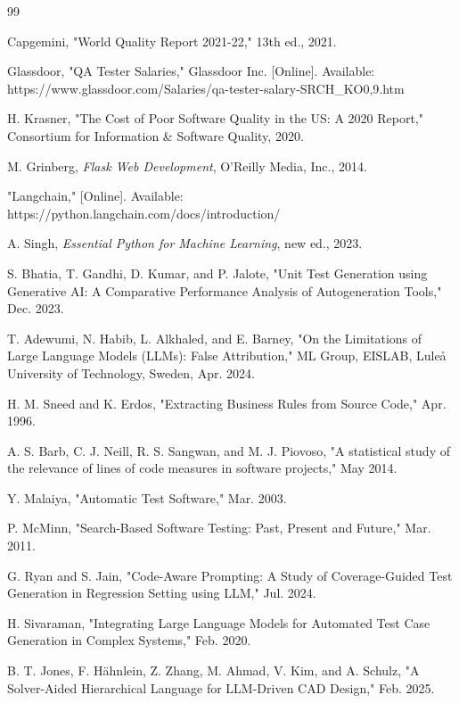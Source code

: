 \documentclass[12pt, oneside]{report}
\begin{document}
\begin{thebibliography}{99}

Capgemini, "World Quality Report 2021-22," 13th ed., 2021.

Glassdoor, "QA Tester Salaries," Glassdoor Inc. [Online]. Available: https://www.glassdoor.com/Salaries/qa-tester-salary-SRCH\_KO0,9.htm

H. Krasner, "The Cost of Poor Software Quality in the US: A 2020 Report," Consortium for Information \& Software Quality, 2020.

M. Grinberg, \textit{Flask Web Development}, O'Reilly Media, Inc., 2014.

"Langchain," [Online]. Available: https://python.langchain.com/docs/introduction/

A. Singh, \textit{Essential Python for Machine Learning}, new ed., 2023.

S. Bhatia, T. Gandhi, D. Kumar, and P. Jalote, "Unit Test Generation using Generative AI: A Comparative Performance Analysis of Autogeneration Tools," Dec. 2023.

T. Adewumi, N. Habib, L. Alkhaled, and E. Barney, "On the Limitations of Large Language Models (LLMs): False Attribution," ML Group, EISLAB, Luleå University of Technology, Sweden, Apr. 2024.

H. M. Sneed and K. Erdos, "Extracting Business Rules from Source Code," Apr. 1996.

A. S. Barb, C. J. Neill, R. S. Sangwan, and M. J. Piovoso, "A statistical study of the relevance of lines of code measures in software projects," May 2014.

Y. Malaiya, "Automatic Test Software," Mar. 2003.

P. McMinn, "Search-Based Software Testing: Past, Present and Future," Mar. 2011.

G. Ryan and S. Jain, "Code-Aware Prompting: A Study of Coverage-Guided Test Generation in Regression Setting using LLM," Jul. 2024.

H. Sivaraman, "Integrating Large Language Models for Automated Test Case Generation in Complex Systems," Feb. 2020.

B. T. Jones, F. Hähnlein, Z. Zhang, M. Ahmad, V. Kim, and A. Schulz, "A Solver-Aided Hierarchical Language for LLM-Driven CAD Design," Feb. 2025.


\end{thebibliography}
\end{document}
